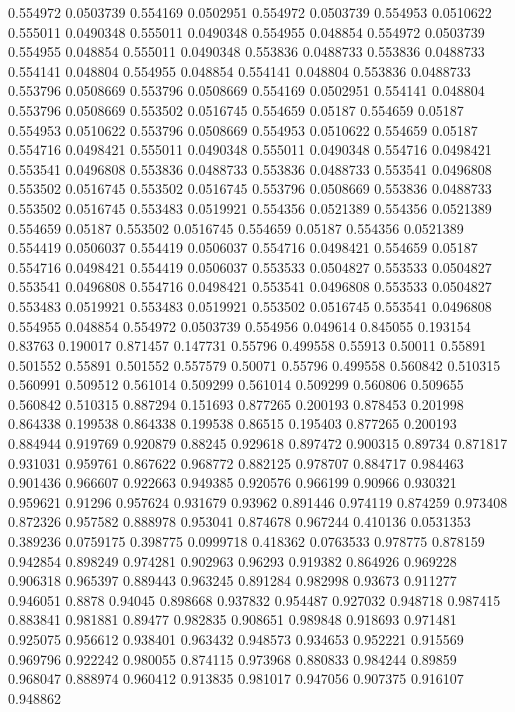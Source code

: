 0.554972 0.0503739
0.554169 0.0502951
0.554972 0.0503739
0.554953 0.0510622
0.555011 0.0490348
0.555011 0.0490348
0.554955 0.048854
0.554972 0.0503739
0.554955 0.048854
0.555011 0.0490348
0.553836 0.0488733
0.553836 0.0488733
0.554141 0.048804
0.554955 0.048854
0.554141 0.048804
0.553836 0.0488733
0.553796 0.0508669
0.553796 0.0508669
0.554169 0.0502951
0.554141 0.048804
0.553796 0.0508669
0.553502 0.0516745
0.554659 0.05187
0.554659 0.05187
0.554953 0.0510622
0.553796 0.0508669
0.554953 0.0510622
0.554659 0.05187
0.554716 0.0498421
0.555011 0.0490348
0.555011 0.0490348
0.554716 0.0498421
0.553541 0.0496808
0.553836 0.0488733
0.553836 0.0488733
0.553541 0.0496808
0.553502 0.0516745
0.553502 0.0516745
0.553796 0.0508669
0.553836 0.0488733
0.553502 0.0516745
0.553483 0.0519921
0.554356 0.0521389
0.554356 0.0521389
0.554659 0.05187
0.553502 0.0516745
0.554659 0.05187
0.554356 0.0521389
0.554419 0.0506037
0.554419 0.0506037
0.554716 0.0498421
0.554659 0.05187
0.554716 0.0498421
0.554419 0.0506037
0.553533 0.0504827
0.553533 0.0504827
0.553541 0.0496808
0.554716 0.0498421
0.553541 0.0496808
0.553533 0.0504827
0.553483 0.0519921
0.553483 0.0519921
0.553502 0.0516745
0.553541 0.0496808
0.554955 0.048854
0.554972 0.0503739
0.554956 0.049614
0.845055 0.193154
0.83763 0.190017
0.871457 0.147731
0.55796 0.499558
0.55913 0.50011
0.55891 0.501552
0.55891 0.501552
0.557579 0.50071
0.55796 0.499558
0.560842 0.510315
0.560991 0.509512
0.561014 0.509299
0.561014 0.509299
0.560806 0.509655
0.560842 0.510315
0.887294 0.151693
0.877265 0.200193
0.878453 0.201998
0.864338 0.199538
0.864338 0.199538
0.86515 0.195403
0.877265 0.200193
0.884944 0.919769
0.920879 0.88245
0.929618 0.897472
0.900315 0.89734
0.871817 0.931031
0.959761 0.867622
0.968772 0.882125
0.978707 0.884717
0.984463 0.901436
0.966607 0.922663
0.949385 0.920576
0.966199 0.90966
0.930321 0.959621
0.91296 0.957624
0.931679 0.93962
0.891446 0.974119
0.874259 0.973408
0.872326 0.957582
0.888978 0.953041
0.874678 0.967244
0.410136 0.0531353
0.389236 0.0759175
0.398775 0.0999718
0.418362 0.0763533
0.978775 0.878159
0.942854 0.898249
0.974281 0.902963
0.96293 0.919382
0.864926 0.969228
0.906318 0.965397
0.889443 0.963245
0.891284 0.982998
0.93673 0.911277
0.946051 0.8878
0.94045 0.898668
0.937832 0.954487
0.927032 0.948718
0.987415 0.883841
0.981881 0.89477
0.982835 0.908651
0.989848 0.918693
0.971481 0.925075
0.956612 0.938401
0.963432 0.948573
0.934653 0.952221
0.915569 0.969796
0.922242 0.980055
0.874115 0.973968
0.880833 0.984244
0.89859 0.968047
0.888974 0.960412
0.913835 0.981017
0.947056 0.907375
0.916107 0.948862
